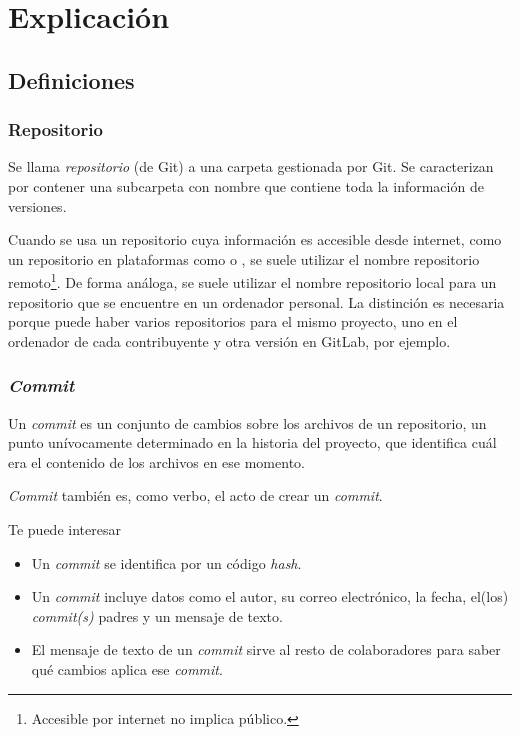 \section{Explicación}

\subsection{Definiciones}

\begin{frame}\frametitle{Repositorio}
Se llama \emph{repositorio} (de Git) a una carpeta gestionada por Git.
Se caracterizan por contener una subcarpeta con nombre 
que contiene toda la información de versiones.

Cuando se usa un repositorio cuya información es accesible desde internet,
como un repositorio en plataformas como \GitHub{} o \GitLab{},
se suele utilizar el nombre repositorio remoto\footnote{
Accesible por internet no implica público.
}.
De forma análoga, se suele utilizar el nombre repositorio local para
un repositorio que se encuentre en un ordenador personal.
La distinción es necesaria porque puede haber varios repositorios para el mismo proyecto,
uno en el ordenador de cada contribuyente y otra versión en GitLab, por ejemplo.
\end{frame}

\begin{frame}\frametitle{\textit{Commit}}
Un \emph{commit} es un conjunto de cambios sobre los archivos de un repositorio,
un punto unívocamente determinado en la historia del proyecto,
que identifica cuál era el contenido de los archivos en ese momento.

\emph{Commit} también es, como verbo, el acto de crear un \textit{commit}.

\vfill
\begin{block}{Te puede interesar}
    \begin{itemize}
        \item Un \textit{commit} se identifica por un código \textit{hash}.
        \item Un \textit{commit} incluye datos como
        el autor, su correo electrónico, la fecha,
        el(los) \textit{commit(s)} padres y
        un mensaje de texto.
        \item El mensaje de texto de un \textit{commit} sirve al resto de colaboradores
        para saber qué cambios aplica ese \textit{commit}.
    \end{itemize}
\end{block}
\end{frame}

